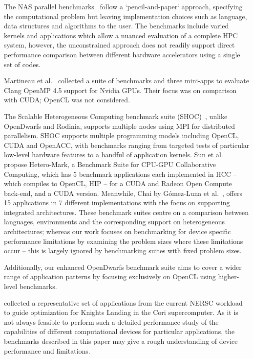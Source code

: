 \documentclass[../document.tex]{subfiles}
\begin{document}
\label{sec:related_work}
	
The NAS parallel benchmarks~\cite{bailey1991parallel} follow a `pencil-and-paper` approach, specifying the computational problem but leaving implementation choices such as language, data structures and algorithms to the user.
The benchmarks include varied kernels and applications which allow a nuanced evaluation of a complete HPC system, however, the unconstrained approach does not readily support direct performance comparison between different hardware accelerators using a single set of codes.

Martineau et al.~\cite{martineau2016performance} collected a suite of benchmarks and three mini-apps to evaluate Clang OpenMP 4.5 support for Nvidia GPUs.
Their focus was on comparison with CUDA; OpenCL was not considered.

The Scalable Heterogeneous Computing benchmark suite (SHOC)~\cite{lopez2015examining}, unlike OpenDwarfs and Rodinia, supports multiple nodes using MPI for distributed parallelism.
SHOC supports multiple programming models including OpenCL, CUDA and OpenACC, with benchmarks ranging from targeted tests of particular low-level hardware features to a handful of application kernels.
Sun et al.~\cite{sun2016} propose Hetero-Mark, a Benchmark Suite for CPU-GPU Collaborative Computing, which has 5 benchmark applications each implemented in HCC -- which compiles to OpenCL, HIP -- for a CUDA and Radeon Open Compute back-end, and a CUDA version.
Meanwhile, Chai by G{\'o}mez-Luna et al.~\cite{gomez2017chai}, offers 15 applications in 7 different implementations with the focus on supporting integrated architectures.
These benchmark suites centre on a comparison between languages, environments and the corresponding support on heterogeneous architectures; whereas our work focuses on benchmarking for device specific performance limitations by examining the problem sizes where these limitations occur -- this is largely ignored by benchmarking suites with fixed problem sizes.

Additionally, our enhanced OpenDwarfs benchmark suite aims to cover a wider range of application patterns by focusing exclusively on OpenCL using higher-level benchmarks.

\citet{barnes2016evaluating} collected a representative set of applications from the current NERSC workload to guide optimization for Knights Landing in the Cori supercomputer.
As it is not always feasible to perform such a detailed performance study of the capabilities of different computational devices for particular applications, the benchmarks described in this paper may give a rough understanding of device performance and limitations.
\end{document}
